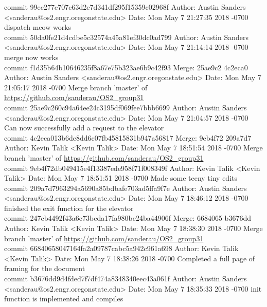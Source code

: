\documentclass[onecolumn, draftclsnofoot,10pt, compsoc]{IEEEtran}
\begin{document}
{commit 99ec277e707c63d2e7d341df295f15359c02968f
Author: Austin Sanders <sanderau@os2.engr.oregonstate.edu>
Date:   Mon May 7 21:27:35 2018 -0700
dispatch meow works\\

commit 50da0fe21d4cdbe5c32574a45a81ef30dc0ad799
Author: Austin Sanders <sanderau@os2.engr.oregonstate.edu>
Date:   Mon May 7 21:14:14 2018 -0700
merge now works\\

commit f1d35b64b10646235f8a67e75b323ae6b9c42f93
Merge: 25ae9c2 4c2eca0
Author: Austin Sanders <sanderau@os2.engr.oregonstate.edu>
Date:   Mon May 7 21:05:17 2018 -0700
Merge branch 'master' of \url{https://github.com/sanderau/OS2_group31}\\

commit 25ae9c260c94a64ee24c3195df069fee7bbb6699
Author: Austin Sanders <sanderau@os2.engr.oregonstate.edu>
Date:   Mon May 7 21:04:57 2018 -0700
Can now successfully add a request to the elevator\\

commit 4c2eca013b6de8dd6c07fb45815831b947a56817
Merge: 9eb4f72 209a7d7
Author: Kevin Talik <Kevin Talik>
Date:   Mon May 7 18:51:54 2018 -0700
Merge branch 'master' of \url{https://github.com/sanderau/OS2_group31}\\

commit 9eb4f72db049415e4f13387ede958f71f008349f
Author: Kevin Talik <Kevin Talik>
Date:   Mon May 7 18:51:51 2018 -0700
Made some teeny tiny edits\\

commit 209a7d7963294a5690a85bdbafe703ad5ffa9f7e
Author: Austin Sanders <sanderau@os2.engr.oregonstate.edu>
Date:   Mon May 7 18:46:12 2018 -0700
finished the exit function for the elevator\\

commit 247cb4492f43a6c73bcda17fa980be24ba44906f
Merge: 6684065 b3676dd
Author: Kevin Talik <Kevin Talik>
Date:   Mon May 7 18:38:30 2018 -0700
Merge branch 'master' of \url{https://github.com/sanderau/OS2_group31}\\

commit 66840658047164fa2a09787cabc5a942c961a698
Author: Kevin Talik <Kevin Talik>
Date:   Mon May 7 18:38:26 2018 -0700
Completed a full page of framing for the document\\

commit b3676dd9d4fded7f7df474a8348340eec43a061f
Author: Austin Sanders <sanderau@os2.engr.oregonstate.edu>
Date:   Mon May 7 18:35:33 2018 -0700
init function is implemented and compiles\\

}
\end{document}
